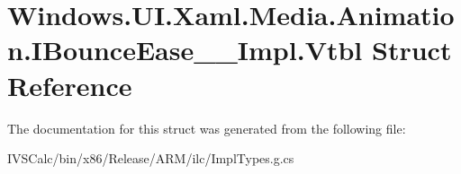 \hypertarget{struct_windows_1_1_u_i_1_1_xaml_1_1_media_1_1_animation_1_1_i_bounce_ease_____impl_1_1_vtbl}{}\section{Windows.\+U\+I.\+Xaml.\+Media.\+Animation.\+I\+Bounce\+Ease\+\_\+\+\_\+\+Impl.\+Vtbl Struct Reference}
\label{struct_windows_1_1_u_i_1_1_xaml_1_1_media_1_1_animation_1_1_i_bounce_ease_____impl_1_1_vtbl}


The documentation for this struct was generated from the following file\+:\begin{DoxyCompactItemize}
\item 
I\+V\+S\+Calc/bin/x86/\+Release/\+A\+R\+M/ilc/Impl\+Types.\+g.\+cs\end{DoxyCompactItemize}
